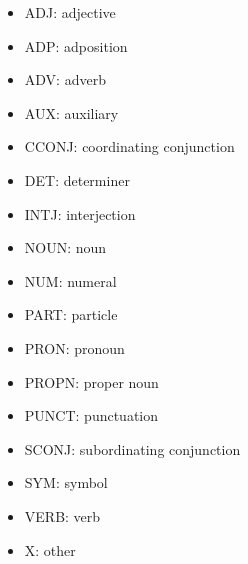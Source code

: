 \documentclass[USenglish]{article}
\begin{document}
\begin{itemize}
    \item ADJ: adjective
    \item ADP: adposition
    \item ADV: adverb
    \item AUX: auxiliary
    \item CCONJ: coordinating conjunction
    \item DET: determiner
    \item INTJ: interjection
    \item NOUN: noun
    \item NUM: numeral
    \item PART: particle
    \item PRON: pronoun
    \item PROPN: proper noun
    \item PUNCT: punctuation
    \item SCONJ: subordinating conjunction
    \item SYM: symbol
    \item VERB: verb
    \item X: other
\end{itemize}
\end{document}

